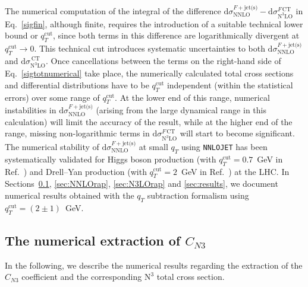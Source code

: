 \documentclass[12pt]{article}
\DeclareRobustCommand{\qt}{\ensuremath{q_T}\xspace}
\DeclareRobustCommand{\qtcut}{\ensuremath{q_T^\mathrm{cut}}\xspace}
\DeclareRobustCommand{\rd}{\ensuremath{\mathrm{d}}}
\DeclareRobustCommand{\jets}{\text{jet(s)}\xspace}
\DeclareRobustCommand{\CT}{\text{CT}\xspace}
\DeclareRobustCommand{\LO}{\text{LO}\xspace}
\DeclareRobustCommand{\NNLO}{\text{NNLO}\xspace}
\DeclareRobustCommand{\N}[1]{\ensuremath{\text{N}^{#1}}} %
\begin{document}
The numerical computation of the integral of the difference $\rd{\sigma}_{\NNLO}^{F+\jets}-\rd{\sigma}_{\N3\LO}^{F\,\CT}$ in Eq.~\eqref{sigfin}, although finite, requires the introduction of a suitable technical lower bound or $\qtcut$, since both terms in this difference are logarithmically divergent at $\qtcut \to 0$. 
 This technical cut introduces systematic uncertainties to both $\rd{\sigma}_{\NNLO}^{F+\jets}$ and $\rd{\sigma}_{\N3\LO}^{\,\CT}$. Once cancellations between the terms on the right-hand side of Eq.~\eqref{sigtotnumerical} take place, the numerically calculated total cross sections and differential distributions have to be $\qtcut$ independent (within the statistical errors) over some range of $\qtcut$. At the lower end of this range, 
numerical instabilities in $\rd{\sigma}_{\NNLO}^{F+\jets}$ (arising from the large dynamical range in this calculation) 
will limit the accuracy of the result, while at the 
higher end of the range, missing non-logarithmic terms in  $\rd{\sigma}_{\N3\LO}^{F\,\CT}$ will start to 
become significant. 
The numerical stability of $\rd{\sigma}_{\NNLO}^{F+\jets}$ at small $\qt$ using \texttt{NNLOJET} has been systematically validated for Higgs boson production (with $\qtcut=0.7$~GeV in Ref.~\cite{Chen:2018pzu}) and Drell--Yan production (with $\qtcut=2$~GeV in Ref.~\cite{Bizon:2018foh}) at the LHC. In Sections~\ref{sec:numCN3}, \ref{sec:NNLOrap}, \ref{sec:N3LOrap} and \ref{sec:results}, we document numerical results obtained with the $\qt$ subtraction formalism using $\qtcut=(2\pm 1)$~GeV.



\subsection{The numerical extraction of \texorpdfstring{$C_{N3}$}{CN3}}
\label{sec:numCN3}

In the following, we describe the numerical results regarding the extraction of the $C_{N3}$ coefficient and the corresponding \N3\LO total cross section. 
\end{document}
